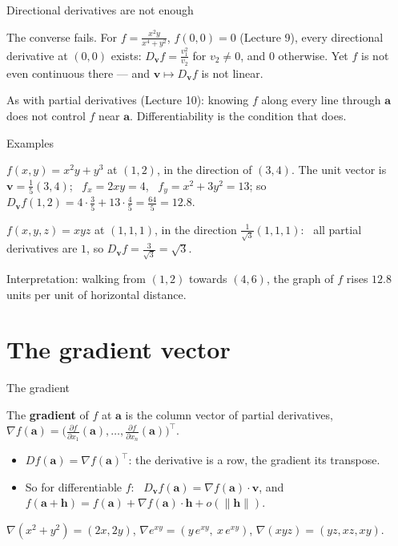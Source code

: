 \documentclass[10pt]{wosm-slides}
\newcommand{\norm}[1]{\lVert #1 \rVert}
\newcommand{\va}{\mathbf{a}}
\newcommand{\vh}{\mathbf{h}}
\DeclareRobustCommand{\vv}{\mathbf{v}}
\begin{document}
\begin{frame}{Directional derivatives are not enough}
  \begin{warning}
    The converse fails. For $f = \frac{x^2 y}{x^4 + y^2}$, $f(0,0) = 0$ (Lecture 9), every
    directional derivative at $(0, 0)$ exists: $D_\vv f = \frac{v_1^2}{v_2}$ for $v_2 \ne 0$, and $0$
    otherwise. Yet $f$ is not even continuous there --- and $\vv \mapsto D_\vv f$ is not linear.
  \end{warning}
  As with partial derivatives (Lecture 10): knowing $f$ along every line through $\va$ does not
  control $f$ near $\va$. Differentiability is the condition that does.
\end{frame}

\begin{frame}{Examples}
  \begin{example}
    $f(x, y) = x^2 y + y^3$ at $(1, 2)$, in the direction of $(3, 4)$.
    The unit vector is $\vv = \frac15(3, 4)$; \ $f_x = 2xy = 4$, \ $f_y = x^2 + 3y^2 = 13$; so
    $D_\vv f(1, 2) = 4 \cdot \frac35 + 13 \cdot \frac45 = \frac{64}{5} = 12.8$.
  \end{example}
  \pause
  \begin{example}
    $f(x, y, z) = xyz$ at $(1, 1, 1)$, in the direction $\frac{1}{\sqrt3}(1, 1, 1)$:
    \ all partial derivatives are $1$, so $D_\vv f = \frac{3}{\sqrt3} = \sqrt3$.
  \end{example}
  {\small Interpretation: walking from $(1, 2)$ towards $(4, 6)$, the graph of $f$ rises
  $12.8$ units per unit of horizontal distance.\par}
\end{frame}

\section{The gradient vector}

\begin{frame}{The gradient}
  \begin{definition}
    The \textbf{gradient} of $f$ at $\va$ is the column vector of partial derivatives,
    $\nabla f(\va) = \bigl(\frac{\partial f}{\partial x_1}(\va), \dots,
    \frac{\partial f}{\partial x_n}(\va)\bigr)^{\!\top}$.
  \end{definition}
  \begin{itemize}
    \item $Df(\va) = \nabla f(\va)^\top$: the derivative is a row, the gradient its transpose.
    \item So for differentiable $f$: \ $D_\vv f(\va) = \nabla f(\va) \cdot \vv$, and
      $f(\va + \vh) = f(\va) + \nabla f(\va) \cdot \vh + o(\norm{\vh})$.
  \end{itemize}
  \pause
  \begin{example}
    $\nabla(x^2 + y^2) = (2x, 2y)$, \quad
    $\nabla e^{xy} = (y\, e^{xy}, \ x\, e^{xy})$, \quad
    $\nabla(xyz) = (yz, xz, xy)$.
  \end{example}
\end{frame}
\end{document}
